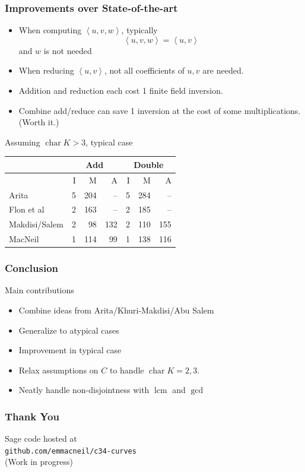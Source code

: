 \documentclass{beamer}
\newcommand{\pid}[1]{\left\langle #1 \right\rangle}
\DeclareMathOperator{\Char}{char}
\DeclareMathOperator{\lcm}{lcm}
\begin{document}

\begin{frame}
\frametitle{Improvements over State-of-the-art}
  \begin{itemize}
    \item When computing $\pid{u, v, w}$, typically \[ \pid{u,v,w} = \pid{u,v} \] and $w$ is not needed
    \item When reducing $\pid{u, v}$, not all coefficients of $u, v$ are needed. 
    \item Addition and reduction each cost 1 finite field inversion.
    \item Combine add/reduce can save 1 inversion at the cost of some multiplications. (Worth it.)
  \end{itemize}

  Assuming $\Char K > 3$, typical case
  \begin{center}
    \begin{tabular}{l|rrr|rrr}
      & \multicolumn{3}{|c}{Add} & \multicolumn{3}{|c}{Double} \\
      \hline
      & I & M & A & I & M & A \\
      \hline
      Arita         & 5 & 204 &  -- & 5 & 284 & -- \\
      Flon et al    & 2 & 163 &  -- & 2 & 185 &  -- \\
      Makdisi/Salem & 2 &  98 & 132 & 2 & 110 & 155 \\
      MacNeil       & 1 & 114 &  99 & 1 & 138 & 116 
    \end{tabular}
  \end{center}
\end{frame}


\begin{frame}
\frametitle{Conclusion}
  Main contributions
  \begin{itemize}
    \item Combine ideas from Arita/Khuri-Makdisi/Abu Salem
    \item Generalize to atypical cases
    \item Improvement in typical case
    \item Relax assumptions on $C$ to handle $\Char K = 2, 3$.
    \item Neatly handle non-disjointness with $\lcm$ and $\gcd$
  \end{itemize}
\end{frame}


\begin{frame}
\frametitle{Thank You}
  \begin{center}
    Sage code hosted at \\
    {\tt github.com/emmacneil/c34-curves} \\
    (Work in progress) \\
  \end{center}
  \printbibliography
\end{frame}

\end{document}
